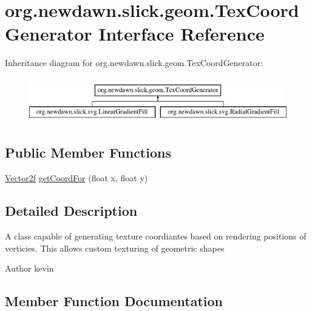 \hypertarget{interfaceorg_1_1newdawn_1_1slick_1_1geom_1_1_tex_coord_generator}{}\section{org.\+newdawn.\+slick.\+geom.\+Tex\+Coord\+Generator Interface Reference}
\label{interfaceorg_1_1newdawn_1_1slick_1_1geom_1_1_tex_coord_generator}
Inheritance diagram for org.\+newdawn.\+slick.\+geom.\+Tex\+Coord\+Generator\+:\begin{figure}[H]
\begin{center}
\leavevmode
\includegraphics[height=2.000000cm]{interfaceorg_1_1newdawn_1_1slick_1_1geom_1_1_tex_coord_generator}
\end{center}
\end{figure}
\subsection*{Public Member Functions}
\begin{DoxyCompactItemize}
\item 
\mbox{\hyperlink{classorg_1_1newdawn_1_1slick_1_1geom_1_1_vector2f}{Vector2f}} \mbox{\hyperlink{interfaceorg_1_1newdawn_1_1slick_1_1geom_1_1_tex_coord_generator_a2a67773df4f90a0bcb3f65d5499919d7}{get\+Coord\+For}} (float x, float y)
\end{DoxyCompactItemize}


\subsection{Detailed Description}
A class capable of generating texture coordiantes based on rendering positions of verticies. This allows custom texturing of geometric shapes

\begin{DoxyAuthor}{Author}
kevin 
\end{DoxyAuthor}


\subsection{Member Function Documentation}
\mbox{\label{interfaceorg_1_1newdawn_1_1slick_1_1geom_1_1_tex_coord_generator_a2a67773df4f90a0bcb3f65d5499919d7}} 
